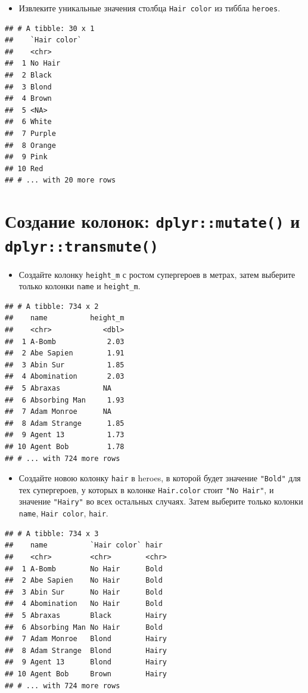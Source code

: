 \documentclass[]{book}
\providecommand{\tightlist}{%
  \setlength{\itemsep}{0pt}\setlength{\parskip}{0pt}}
\begin{document}
\begin{itemize}
\tightlist
\item
  Извлеките уникальные значения столбца \texttt{Hair\ color} из тиббла
  \texttt{heroes}.
\end{itemize}

\begin{verbatim}
## # A tibble: 30 x 1
##    `Hair color`
##    <chr>       
##  1 No Hair     
##  2 Black       
##  3 Blond       
##  4 Brown       
##  5 <NA>        
##  6 White       
##  7 Purple      
##  8 Orange      
##  9 Pink        
## 10 Red         
## # ... with 20 more rows
\end{verbatim}

\section{\texorpdfstring{Создание колонок: \texttt{dplyr::mutate()} и
\texttt{dplyr::transmute()}}{Создание колонок: dplyr::mutate() и dplyr::transmute()}}\label{task_mutate}

\begin{itemize}
\tightlist
\item
  Создайте колонку \texttt{height\_m} с ростом супергероев в метрах,
  затем выберите только колонки \texttt{name} и \texttt{height\_m}.
\end{itemize}

\begin{verbatim}
## # A tibble: 734 x 2
##    name          height_m
##    <chr>            <dbl>
##  1 A-Bomb            2.03
##  2 Abe Sapien        1.91
##  3 Abin Sur          1.85
##  4 Abomination       2.03
##  5 Abraxas          NA   
##  6 Absorbing Man     1.93
##  7 Adam Monroe      NA   
##  8 Adam Strange      1.85
##  9 Agent 13          1.73
## 10 Agent Bob         1.78
## # ... with 724 more rows
\end{verbatim}

\begin{itemize}
\tightlist
\item
  Создайте новою колонку \texttt{hair} в heroes, в которой будет
  значение \texttt{"Bold"} для тех супергероев, у которых в колонке
  \texttt{Hair.color} стоит \texttt{"No\ Hair"}, и значение
  \texttt{"Hairy"} во всех остальных случаях. Затем выберите только
  колонки \texttt{name}, \texttt{Hair\ color}, \texttt{hair}.
\end{itemize}

\begin{verbatim}
## # A tibble: 734 x 3
##    name          `Hair color` hair 
##    <chr>         <chr>        <chr>
##  1 A-Bomb        No Hair      Bold 
##  2 Abe Sapien    No Hair      Bold 
##  3 Abin Sur      No Hair      Bold 
##  4 Abomination   No Hair      Bold 
##  5 Abraxas       Black        Hairy
##  6 Absorbing Man No Hair      Bold 
##  7 Adam Monroe   Blond        Hairy
##  8 Adam Strange  Blond        Hairy
##  9 Agent 13      Blond        Hairy
## 10 Agent Bob     Brown        Hairy
## # ... with 724 more rows
\end{verbatim}
\end{document}
